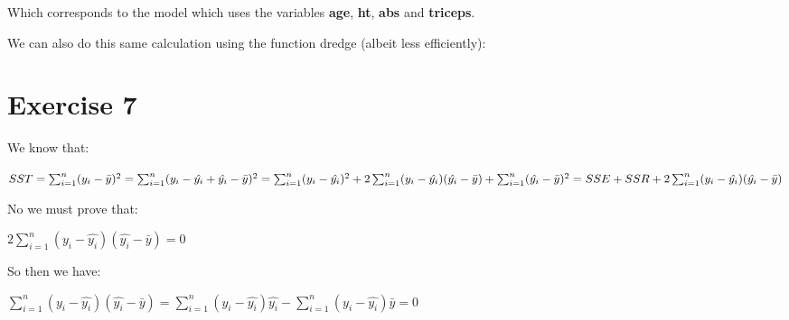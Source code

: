 \documentclass[]{article}
\newenvironment{Shaded}{\begin{snugshade}}{\end{snugshade}}
\newcommand{\CommentTok}[1]{\textcolor[rgb]{0.56,0.35,0.01}{\textit{#1}}}
\newcommand{\DataTypeTok}[1]{\textcolor[rgb]{0.13,0.29,0.53}{#1}}
\newcommand{\KeywordTok}[1]{\textcolor[rgb]{0.13,0.29,0.53}{\textbf{#1}}}
\newcommand{\NormalTok}[1]{#1}
\newcommand{\OperatorTok}[1]{\textcolor[rgb]{0.81,0.36,0.00}{\textbf{#1}}}
\newcommand{\StringTok}[1]{\textcolor[rgb]{0.31,0.60,0.02}{#1}}
\begin{document}
Which corresponds to the model which uses the variables \textbf{age},
\textbf{ht}, \textbf{abs} and \textbf{triceps}.

We can also do this same calculation using the function dredge (albeit
less efficiently):

\begin{Shaded}
\end{Shaded}

\newpage

\hypertarget{exercise-7}{%
\section{Exercise 7}\label{exercise-7}}

We know that:

\(SST = \sum_{i=1}^{n} (y_{i}-\bar{y})^{2}\\ = \sum_{i=1}^{n} (y_{i} - \hat{y_{i}} + \hat{y_{i}} - \bar{y})^{2}\\ = \sum_{i=1}^{n} (y_{i} - \hat{y_{i}})^{2} + 2 \sum_{i=1}^{n} (y_{i} - \hat{y_{i}}) (\hat{y_{i}} - \bar{y}) + \sum_{i=1}^{n} (\hat{y_{i}} - \bar{y})^{2}\\ = SSE + SSR + 2 \sum_{i=1}^{n} (y_{i}-\hat{y_{i}})(\hat{y_{i}}-\bar{y})\)

No we must prove that:

\(2 \sum_{i=1}^{n} (y_{i}-\hat{y_{i}})(\hat{y_{i}}-\bar{y}) = 0\)

So then we have:

\(\sum_{i=1}^{n} (y_{i}-\hat{y_{i}})(\hat{y_{i}}-\bar{y}) = \sum_{i=1}^{n} (y_{i} - \hat{y_{i}}) \hat{y_{i}} - \sum_{i=1}^{n} (y_{i} - \hat{y_{i}}) \bar{y} = 0\)
\end{document}
